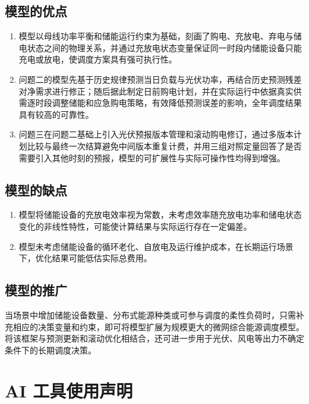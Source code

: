 \documentclass[12pt,a4paper]{ctexart}
\theoremstyle{definition}
\theoremstyle{plain}
\theoremstyle{remark}
\begin{document}
\subsection{模型的优点}

\begin{enumerate}[label=\arabic*.]
\item 模型以母线功率平衡和储能运行约束为基础，刻画了购电、充放电、弃电与储电状态之间的物理关系，并通过充放电状态变量保证同一时段内储能设备只能充电或放电，使调度方案具有强可执行性。
\item 问题二的模型先基于历史规律预测当日负载与光伏功率，再结合历史预测残差对净需求进行修正；随后据此制定日前购电计划，并在实际运行中依据真实供需逐时段调整储能和应急购电策略，有效降低预测误差的影响，全年调度结果具有较高的可靠性。
\item 问题三在问题二基础上引入光伏预报版本管理和滚动购电修订，通过多版本计划比较与最终一次结算避免中间版本重复计费，并用三组对照定量回答了是否需要引入其他时刻的预报，模型的可扩展性与实际可操作性均得到增强。
\end{enumerate}

\subsection{模型的缺点}

\begin{enumerate}[label=\arabic*.]
  \item 模型将储能设备的充放电效率视为常数，未考虑效率随充放电功率和储电状态变化的非线性特性，可能使计算结果与实际运行存在一定偏差。
  \item 模型未考虑储能设备的循环老化、自放电及运行维护成本，在长期运行场景下，优化结果可能低估实际总费用。
\end{enumerate}

\subsection{模型的推广}

当场景中增加储能设备数量、分布式能源种类或可参与调度的柔性负荷时，只需补充相应的决策变量和约束，即可将模型扩展为规模更大的微网综合能源调度模型。将该框架与预测更新和滚动优化相结合，还可进一步用于光伏、风电等出力不确定条件下的长期调度决策。


\section*{AI 工具使用声明}
\end{document}
